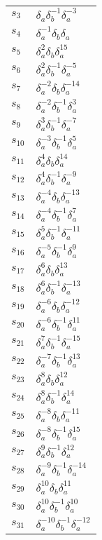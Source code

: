 \documentclass{article}
\begin{document}
\begin{center}
\begin{tabular}{ll}
$s_{3}$ & $\delta_a^{}\delta_b^{-1}\delta_a^{-3}$ \\
$s_{4}$ & $\delta_a^{-1}\delta_b^{}\delta_a^{}$ \\
$s_{5}$ & $\delta_a^{2}\delta_b^{}\delta_a^{15}$ \\
$s_{6}$ & $\delta_a^{2}\delta_b^{-1}\delta_a^{-5}$ \\
$s_{7}$ & $\delta_a^{-2}\delta_b^{}\delta_a^{-14}$ \\
$s_{8}$ & $\delta_a^{-2}\delta_b^{-1}\delta_a^{3}$ \\
$s_{9}$ & $\delta_a^{3}\delta_b^{-1}\delta_a^{-7}$ \\
$s_{10}$ & $\delta_a^{-3}\delta_b^{-1}\delta_a^{5}$ \\
$s_{11}$ & $\delta_a^{4}\delta_b^{}\delta_a^{14}$ \\
$s_{12}$ & $\delta_a^{4}\delta_b^{-1}\delta_a^{-9}$ \\
$s_{13}$ & $\delta_a^{-4}\delta_b^{}\delta_a^{-13}$ \\
$s_{14}$ & $\delta_a^{-4}\delta_b^{-1}\delta_a^{7}$ \\
$s_{15}$ & $\delta_a^{5}\delta_b^{-1}\delta_a^{-11}$ \\
$s_{16}$ & $\delta_a^{-5}\delta_b^{-1}\delta_a^{9}$ \\
$s_{17}$ & $\delta_a^{6}\delta_b^{}\delta_a^{13}$ \\
$s_{18}$ & $\delta_a^{6}\delta_b^{-1}\delta_a^{-13}$ \\
$s_{19}$ & $\delta_a^{-6}\delta_b^{}\delta_a^{-12}$ \\
$s_{20}$ & $\delta_a^{-6}\delta_b^{-1}\delta_a^{11}$ \\
$s_{21}$ & $\delta_a^{7}\delta_b^{-1}\delta_a^{-15}$ \\
$s_{22}$ & $\delta_a^{-7}\delta_b^{-1}\delta_a^{13}$ \\
$s_{23}$ & $\delta_a^{8}\delta_b^{}\delta_a^{12}$ \\
$s_{24}$ & $\delta_a^{8}\delta_b^{-1}\delta_a^{14}$ \\
$s_{25}$ & $\delta_a^{-8}\delta_b^{}\delta_a^{-11}$ \\
$s_{26}$ & $\delta_a^{-8}\delta_b^{-1}\delta_a^{15}$ \\
$s_{27}$ & $\delta_a^{9}\delta_b^{-1}\delta_a^{12}$ \\
$s_{28}$ & $\delta_a^{-9}\delta_b^{-1}\delta_a^{-14}$ \\
$s_{29}$ & $\delta_a^{10}\delta_b^{}\delta_a^{11}$ \\
$s_{30}$ & $\delta_a^{10}\delta_b^{-1}\delta_a^{10}$ \\
$s_{31}$ & $\delta_a^{-10}\delta_b^{-1}\delta_a^{-12}$ \\
\bottomrule
\end{tabular}
\end{center}

\thispagestyle{empty}
\end{document}
